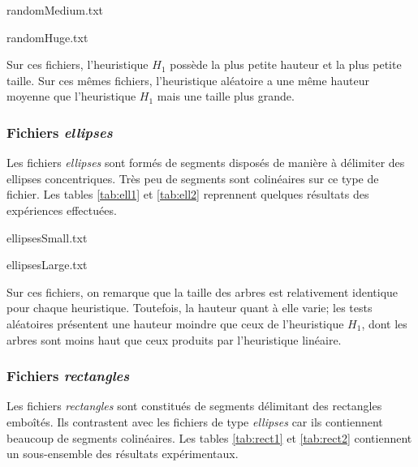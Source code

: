 \begin{table}
\caption{randomMedium.txt}\label{tab:rand1}

\end{table}

\begin{table}
\caption{randomHuge.txt}\label{tab:rand2}

\end{table}

Sur ces fichiers, l'heuristique $H_1$
possède la plus petite hauteur et la plus petite taille.
Sur ces mêmes fichiers, l'heuristique aléatoire a une même hauteur moyenne
que l'heuristique $H_1$ mais une taille plus grande.
\subsubsection*{Fichiers \og\emph{ellipses}\fg}
Les fichiers \og\emph{ellipses}\fg{} sont formés de segments disposés de manière
à délimiter des ellipses concentriques. Très peu de segments
sont colinéaires sur ce type de fichier.
Les tables \ref{tab:ell1} et \ref{tab:ell2} reprennent quelques
résultats des expériences effectuées.

\begin{table}
\caption{ellipsesSmall.txt}\label{tab:ell1}

\end{table}

\begin{table}
\caption{ellipsesLarge.txt}\label{tab:ell2}

\end{table}

Sur ces fichiers, on remarque que la taille des arbres
est relativement identique pour chaque heuristique.
Toutefois, la hauteur quant à elle varie; les tests aléatoires présentent
une hauteur moindre que ceux de l'heuristique $H_1$, dont les arbres
sont moins haut que ceux produits par l'heuristique linéaire.

\subsubsection*{Fichiers \og\emph{rectangles}\fg}
Les fichiers \og\emph{rectangles}\fg{} sont constitués de segments
délimitant des rectangles emboîtés. Ils contrastent avec les fichiers
de type \og\emph{ellipses}\fg{} car ils contiennent beaucoup de segments
colinéaires. Les tables \ref{tab:rect1} et \ref{tab:rect2} contiennent
un sous-ensemble des résultats expérimentaux.


